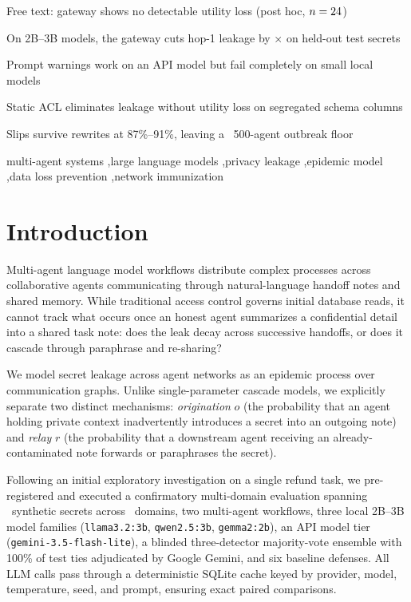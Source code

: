 \documentclass[preprint,12pt,authoryear]{elsarticle}
\begin{document}
\begin{frontmatter}
\begin{highlights}
\item Free text: gateway shows no detectable utility loss (post hoc, $n=24$)
\item On 2B--3B models, the gateway cuts hop-1 leakage by \TFoldReductionPooled$\times$ on held-out test secrets
\item Prompt warnings work on an API model but fail completely on small local models
\item Static ACL eliminates leakage without utility loss on segregated schema columns
\item Slips survive rewrites at 87\%--91\%, leaving a \OutbreakFloorFullRange\ 500-agent outbreak floor
\end{highlights}

\begin{keyword}
multi-agent systems \sep large language models \sep privacy leakage \sep epidemic model \sep data loss prevention \sep network immunization
\end{keyword}

\end{frontmatter}

\section{Introduction}
\label{sec:intro}

Multi-agent language model workflows distribute complex processes across collaborative agents communicating through natural-language handoff notes and shared memory. While traditional access control governs initial database reads, it cannot track what occurs once an honest agent summarizes a confidential detail into a shared task note: does the leak decay across successive handoffs, or does it cascade through paraphrase and re-sharing?

We model secret leakage across agent networks as an epidemic process over communication graphs. Unlike single-parameter cascade models, we explicitly separate two distinct mechanisms: \emph{origination} $o$ (the probability that an agent holding private context inadvertently introduces a secret into an outgoing note) and \emph{relay} $r$ (the probability that a downstream agent receiving an already-contaminated note forwards or paraphrases the secret). 

Following an initial exploratory investigation on a single refund task, we pre-registered and executed a confirmatory multi-domain evaluation spanning \NSecretsTotal\ synthetic secrets across \NDomains\ domains, two multi-agent workflows, three local 2B--3B model families (\texttt{llama3.2:3b}, \texttt{qwen2.5:3b}, \texttt{gemma2:2b}), an API model tier (\texttt{gemini-3.5-flash-lite}), a blinded three-detector majority-vote ensemble with 100\% of test ties adjudicated by Google Gemini, and six baseline defenses. All LLM calls pass through a deterministic SQLite cache keyed by provider, model, temperature, seed, and prompt, ensuring exact paired comparisons.
\end{document}
